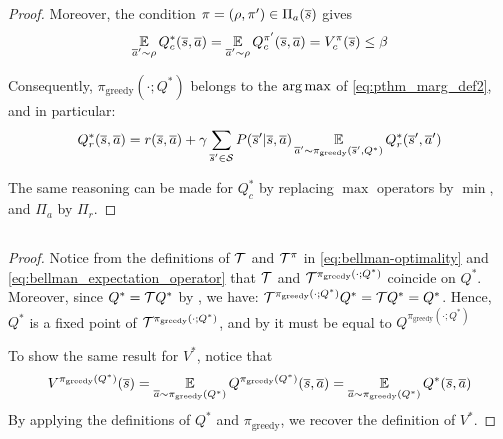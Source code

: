 \begin{proof}
Moreover, the condition $\pi=(\rho, \pi')\in\Pi_a(\overline{s})$ gives
\begin{equation*}
   \operatorname*{\mathbb{E}}\limits_{\overline{a}'\sim\rho} Q_c^{*}(\overline{s}, \overline{a}) = \operatorname*{\mathbb{E}}\limits_{\overline{a}'\sim\rho} Q_c^{\pi'}(\overline{s}, \overline{a}) = V_c^{\pi}(\overline{s}) \leq \beta
\end{equation*}

Consequently, $\pi_\text{greedy}(\cdot; Q^*)$ belongs to the $\operatorname*{arg\,max}$ of \eqref{eq:pthm_marg_def2}, and in particular:
\begin{equation*}
     Q_r^*(\overline{s}, \overline{a}) = r(\overline{s}, \overline{a}) + \gamma \sum_{\overline{s}'\in\mathcal{S}}  P(\overline{s}' | \overline{s}, \overline{a}) \operatorname*{\mathbb{E}}\limits_{\overline{a}'\sim\pi_\text{greedy}(\overline{s}', Q^*)} Q_r^*(\overline{s}', \overline{a}')
\end{equation*}

The same reasoning can be made for $Q_c^*$ by replacing $\max$ operators by $\min$, and $\Pi_a$ by $\Pi_r$.
\end{proof}


\subsection{}
\begin{proof}
Notice from the definitions of $\mathcal{T}$ and $\mathcal{T}^\pi$ in \eqref{eq:bellman-optimality} and \eqref{eq:bellman_expectation_operator} that $\mathcal{T}$ and $\mathcal{T}^{\pi_\text{greedy}(\cdot;Q^*)}$ coincide on $Q^*$. Moreover, since $Q^* = \mathcal{T} Q^*$ by , we have: $    \mathcal{T}^{\pi_\text{greedy}(\cdot;Q^*)} Q^* = \mathcal{T} Q^* = Q^*
$.
Hence, $Q^*$ is a fixed point of $\mathcal{T}^{\pi_\text{greedy}(\cdot;Q^*)}$, and by  it must be equal to $Q^{\pi_\text{greedy}(\cdot;Q^*)}$

To show the same result for $V^*$, notice that 
\begin{equation*}
    V^{\pi_\text{greedy}(Q^*)}(\overline{s}) = \operatorname*{\mathbb{E}}\limits_{\overline{a}\sim\pi_\text{greedy}(Q^*)}Q^{\pi_\text{greedy}(Q^*)}(\overline{s},\overline{a}) = \operatorname*{\mathbb{E}}\limits_{\overline{a}\sim\pi_\text{greedy}(Q^*)}Q^*(\overline{s},\overline{a})
\end{equation*}
By applying the definitions of $Q^*$ and $\pi_\text{greedy}$, we recover the definition of $V^*$.
\end{proof}

